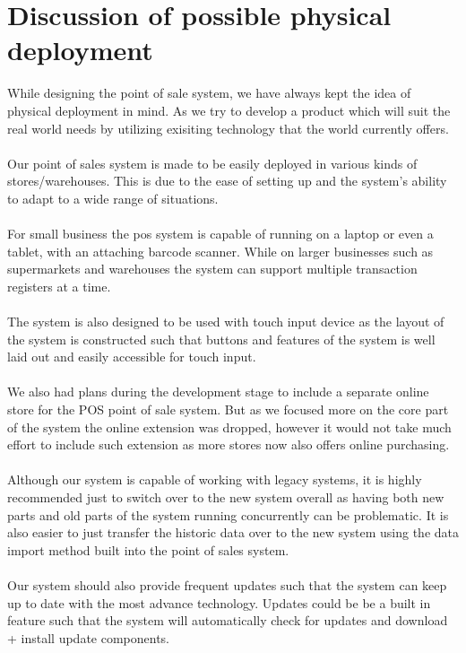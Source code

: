 \documentclass[a4paper]{article}
\begin{document}
\section{Discussion of possible physical deployment}
While designing the point of sale system, we have always kept the idea of physical deployment in mind. As we try to develop a product which will suit the real world needs by utilizing exisiting technology that the world currently offers. 
\\\\
Our point of sales system is made to be easily deployed in various kinds of stores/warehouses. This is due to the ease of setting up and the system’s ability to adapt to a wide range of situations. 
\\\\
For small business the pos system is capable of running on a laptop or even a tablet, with an attaching barcode scanner. While on larger businesses such as supermarkets and warehouses the system can support multiple transaction registers at a time. 
\\\\
The system is also designed to be used with touch input device as the layout of the system is constructed such that buttons and features of the system is well laid out and easily accessible for touch input. 
\\\\
We also had plans during the development stage to include a separate online store for the POS point of sale system. But as we focused more on the core part of the system the online extension was dropped, however it would not take much effort to include such extension as more stores now also offers online purchasing. 
\\\\
Although our system is capable of working with legacy systems, it is highly recommended just to switch over to the new system overall as having both new parts and old parts of the system running concurrently can be problematic. It is also easier to just transfer the historic data over to the new system using the data import method built into the point of sales system. 
\\\\
Our system should also provide frequent updates such that the system can keep up to date with the most advance technology. Updates could be be a built in feature such that the system will automatically check for updates and download + install update components. 
\\\\
\end{document}
